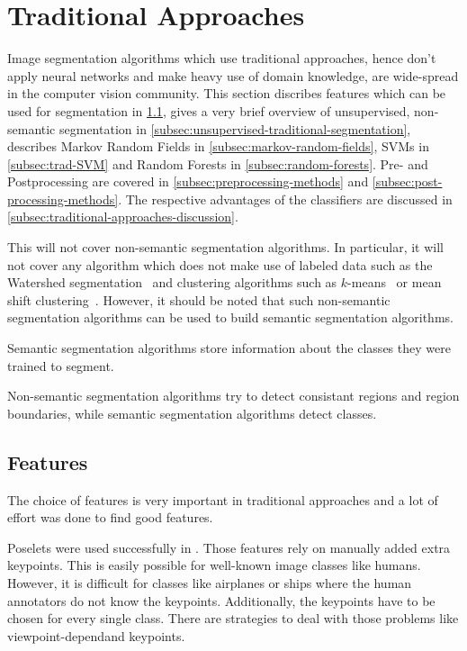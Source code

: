 
\newcommand\independent{\protect\mathpalette{\protect\independenT}{\perp}}
\def\independenT#1#2{\mathrel{\rlap{$#1#2$}\mkern2mu{#1#2}}}

\section{Traditional Approaches}\label{sec:traditional-approaches}%
Image segmentation algorithms which use traditional approaches, hence don't
apply neural networks and make heavy use of domain knowledge, are wide-spread
in the computer vision community. This section discribes features which can be
used for segmentation in \cref{subsec:features}, gives a very brief overview of
unsupervised, non-semantic segmentation in
\cref{subsec:unsupervised-traditional-segmentation}, describes Markov Random
Fields in \cref{subsec:markov-random-fields}, \glspl{SVM} in
\cref{subsec:trad-SVM} and Random Forests in \cref{subsec:random-forests}.
Pre- and Postprocessing are covered in \cref{subsec:preprocessing-methods} and
\cref{subsec:post-processing-methods}. The respective advantages of the
classifiers are discussed in \cref{subsec:traditional-approaches-discussion}.

This will not cover non-semantic segmentation algorithms. In particular, it
will not cover any algorithm which does not make use of labeled data such as
the Watershed segmentation~\cite{beucher1992morphological} and clustering
algorithms such as $k$-means~\cite{hartigan1975clustering} or mean shift
clustering~\cite{comaniciu2002mean}. However, it should be noted that such
non-semantic segmentation algorithms can be used to build semantic segmentation
algorithms.

Semantic segmentation algorithms store information about the classes they were
trained to segment.

Non-semantic segmentation algorithms try to detect consistant regions and
region boundaries, while semantic segmentation algorithms detect classes.


\subsection{Features}\label{subsec:features}%
The choice of features is very important in traditional approaches and a lot
of effort was done to find good features.

Poselets were used successfully in \cite{bourdev2010detecting,brox2011object}.
Those features rely on manually added extra keypoints. This is easily possible
for well-known image classes like humans. However, it is difficult for classes
like airplanes or ships where the human annotators do not know the keypoints.
Additionally, the keypoints have to be chosen for every single class. There are
strategies to deal with those problems like viewpoint-dependand keypoints.

